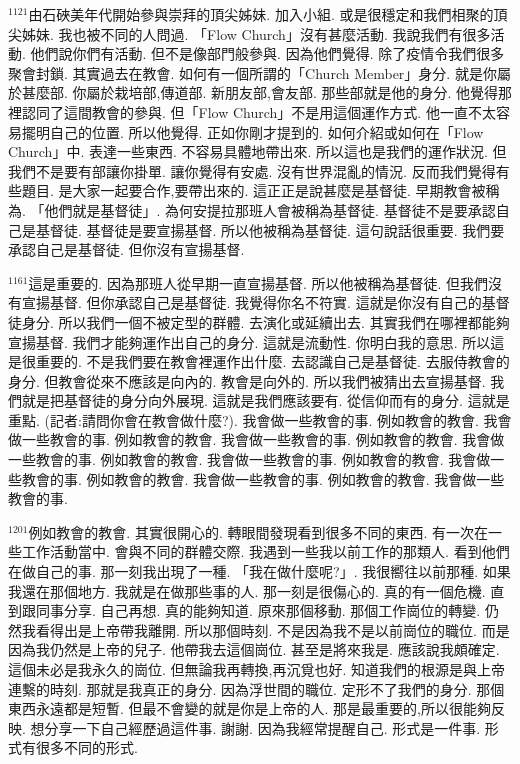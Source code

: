 \documentclass{book}
\begin{document}
$^{1121}$由石硤美年代開始參與崇拜的頂尖姊妹.
加入小組.
或是很穩定和我們相聚的頂尖姊妹.
我也被不同的人問過.
「Flow Church」沒有甚麼活動.
我說我們有很多活動.
他們說你們有活動.
但不是像部門般參與.
因為他們覺得.
除了疫情令我們很多聚會封鎖.
其實過去在教會.
如何有一個所謂的「Church Member」身分.
就是你屬於甚麼部.
你屬於栽培部,傳道部.
新朋友部,會友部.
那些部就是他的身分.
他覺得那裡認同了這間教會的參與.
但「Flow Church」不是用這個運作方式.
他一直不太容易擺明自己的位置.
所以他覺得.
正如你剛才提到的.
如何介紹或如何在「Flow Church」中.
表達一些東西.
不容易具體地帶出來.
所以這也是我們的運作狀況.
但我們不是要有部讓你掛單.
讓你覺得有安處.
沒有世界混亂的情況.
反而我們覺得有些題目.
是大家一起要合作,要帶出來的.
這正正是說甚麼是基督徒.
早期教會被稱為.
「他們就是基督徒」.
為何安提拉那班人會被稱為基督徒.
基督徒不是要承認自己是基督徒.
基督徒是要宣揚基督.
所以他被稱為基督徒.
這句說話很重要.
我們要承認自己是基督徒.
但你沒有宣揚基督.

$^{1161}$這是重要的.
因為那班人從早期一直宣揚基督.
所以他被稱為基督徒.
但我們沒有宣揚基督.
但你承認自己是基督徒.
我覺得你名不符實.
這就是你沒有自己的基督徒身分.
所以我們一個不被定型的群體.
去演化或延續出去.
其實我們在哪裡都能夠宣揚基督.
我們才能夠運作出自己的身分.
這就是流動性.
你明白我的意思.
所以這是很重要的.
不是我們要在教會裡運作出什麼.
去認識自己是基督徒.
去服侍教會的身分.
但教會從來不應該是向內的.
教會是向外的.
所以我們被猜出去宣揚基督.
我們就是把基督徒的身分向外展現.
這就是我們應該要有.
從信仰而有的身分.
這就是重點.
(記者:請問你會在教會做什麼?).
我會做一些教會的事.
例如教會的教會.
我會做一些教會的事.
例如教會的教會.
我會做一些教會的事.
例如教會的教會.
我會做一些教會的事.
例如教會的教會.
我會做一些教會的事.
例如教會的教會.
我會做一些教會的事.
例如教會的教會.
我會做一些教會的事.
例如教會的教會.
我會做一些教會的事.

$^{1201}$例如教會的教會.
其實很開心的.
轉眼間發現看到很多不同的東西.
有一次在一些工作活動當中.
會與不同的群體交際.
我遇到一些我以前工作的那類人.
看到他們在做自己的事.
那一刻我出現了一種.
「我在做什麼呢?」.
我很嚮往以前那種.
如果我還在那個地方.
我就是在做那些事的人.
那一刻是很傷心的.
真的有一個危機.
直到跟同事分享.
自己再想.
真的能夠知道.
原來那個移動.
那個工作崗位的轉變.
仍然我看得出是上帝帶我離開.
所以那個時刻.
不是因為我不是以前崗位的職位.
而是因為我仍然是上帝的兒子.
他帶我去這個崗位.
甚至是將來我是.
應該說我頗確定.
這個未必是我永久的崗位.
但無論我再轉換,再沉覓也好.
知道我們的根源是與上帝連繫的時刻.
那就是我真正的身分.
因為浮世間的職位.
定形不了我們的身分.
那個東西永遠都是短暫.
但最不會變的就是你是上帝的人.
那是最重要的,所以很能夠反映.
想分享一下自己經歷過這件事.
謝謝.
因為我經常提醒自己.
形式是一件事.
形式有很多不同的形式.
\end{document}
